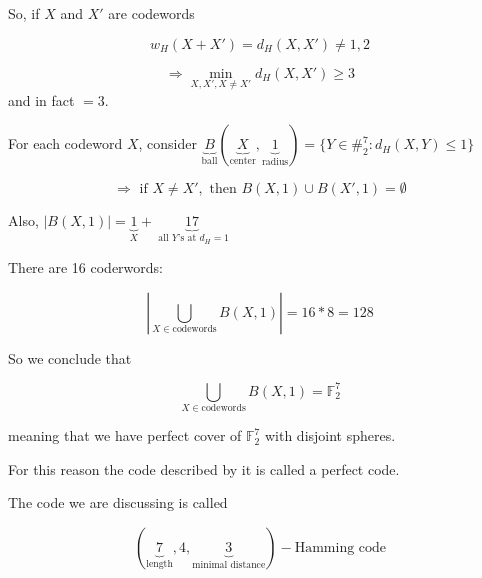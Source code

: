 \documentclass{article}
\newtheorem{observation}{Observation}[section]
\theoremstyle{definition} %
\newtheorem{example}{Example}
\def\F{\mathbb{F}}
\begin{document}
So, if $X$ and $X'$ are codewords

\[
  w_H(X+X') = d_H(X, X') \neq 1,2
\]

\[
  \Rightarrow \min_{X, X', X \neq X'} d_H(X, X') \geq 3
\]
and in fact $ = 3$.

For each codeword $X$, consider $\underbrace{B}_{\text{ball}}(\underbrace{X}_{\text{center}}, \underbrace{1}_{\text{radius}}) = \{Y \in \#^7_2 : d_H(X, Y) \leq 1 \}$

\[
  \Rightarrow \text{ if } X \neq X', \text{ then } B(X, 1) \cup B(X', 1) = \emptyset
\]

Also, $|B(X, 1)| = \underbrace{1}_{X} + \underbrace{17}_{\text{ all } Y \text{'s at } d_H = 1}$

There are 16 coderwords:

\[
  | \bigcup_{X \in \text{codewords}} B(X, 1) | = 16 * 8 = 128
\]

So we conclude that

\[
  \bigcup_{X \in \text{codewords}} B(X, 1) = \F_2^7
\]

meaning that we have perfect cover of $\F_2^7$ with disjoint spheres.

For this reason the code described by it is called a perfect code.

The code we are discussing is called

\[
  (\underbrace{7}_{\text{length}}, 4, \underbrace{3}_{\text{minimal distance}})-\text{Hamming code}
\]






\end{document}
